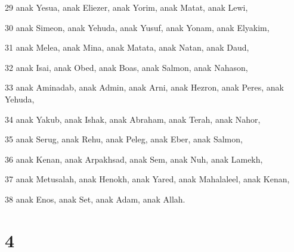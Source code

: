 \par 29 anak Yesua, anak Eliezer, anak Yorim, anak Matat, anak Lewi,
\par 30 anak Simeon, anak Yehuda, anak Yusuf, anak Yonam, anak Elyakim,
\par 31 anak Melea, anak Mina, anak Matata, anak Natan, anak Daud,
\par 32 anak Isai, anak Obed, anak Boas, anak Salmon, anak Nahason,
\par 33 anak Aminadab, anak Admin, anak Arni, anak Hezron, anak Peres, anak Yehuda,
\par 34 anak Yakub, anak Ishak, anak Abraham, anak Terah, anak Nahor,
\par 35 anak Serug, anak Rehu, anak Peleg, anak Eber, anak Salmon,
\par 36 anak Kenan, anak Arpakhsad, anak Sem, anak Nuh, anak Lamekh,
\par 37 anak Metusalah, anak Henokh, anak Yared, anak Mahalaleel, anak Kenan,
\par 38 anak Enos, anak Set, anak Adam, anak Allah.

\chapter{4}

